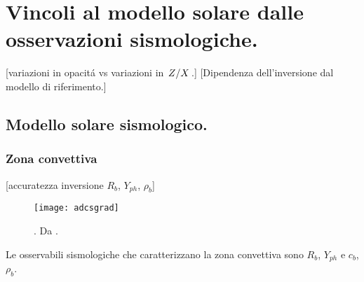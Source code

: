 \documentclass[../main.tex]{subfiles}
\begin{document}
{\let\clearpage\relax\let\cleardoublepage\relax
\chapter{Vincoli al modello solare dalle osservazioni sismologiche.}%
}


[variazioni in opacit\'a vs variazioni in $\left.{Z}\middle/{X}\right.$.]
[Dipendenza dell'inversione dal modello di riferimento.]


\section{Modello solare sismologico.}


\subsection{Zona convettiva}

[accuratezza inversione $R_b$, $Y_{ph}$, $\rho_b$]

\begin{wrapfigure}[]{r}{0.4\textwidth}
\centering
\texttt{[image: adcsgrad]}
\caption{. Da \cite{christensen1991depth}.}
\end{wrapfigure}


Le osservabili sismologiche che caratterizzano la zona convettiva sono $R_b$, $Y_{ph}$ e $c_b$, $\rho_b$.
\end{document}

